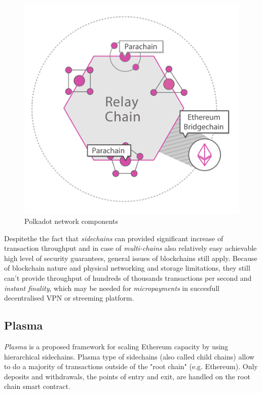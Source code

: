 \documentclass[a4paper,12pt]{article}
\begin{document}
\begin{figure}[H]
    \centering
    \includegraphics[scale=0.5]{../img/polkadot}
    \caption{Polkadot network components}
    \label{img:polkadot}
\end{figure}

Despitethe the fact that \textit{sidechains} can provided significant increase 
of transaction throughput and in case of \textit{multi-chains} also relatively
easy achievable high level of security guarantees, general issues of blockchains
still apply. Because of blockchain nature and physical networking and storage 
limitations, they still can't provide throughput of hundreds of thousands 
transactions per second and \textit{instant finality}, which may be needed for 
\textit{micropayments} in succesfull decentralised VPN or streeming platform.

\subsection{Plasma}

\textit{Plasma} \cite{plasma} is a proposed framework for scaling Ethereum 
capacity by using hierarchical sidechains. Plasma type of sidechains (also 
called child chains) allow to do a majority of transactions outside of the "root
chain" (e.g. Ethereum). Only deposits and withdrawals, the points of entry and 
exit, are handled on the root chain smart contract.
\end{document}
